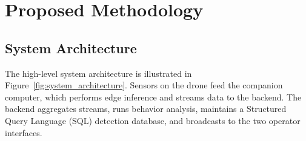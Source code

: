 \chapter{Proposed Methodology}
\label{Proposed_Methodology}




\section{System Architecture}
The high-level system architecture is illustrated in Figure~\ref{fig:system_architecture}. Sensors on the drone feed the companion computer, which performs edge inference and streams data to the backend. The backend aggregates streams, runs behavior analysis, maintains a Structured Query Language (SQL) detection database, and broadcasts to the two operator interfaces.

